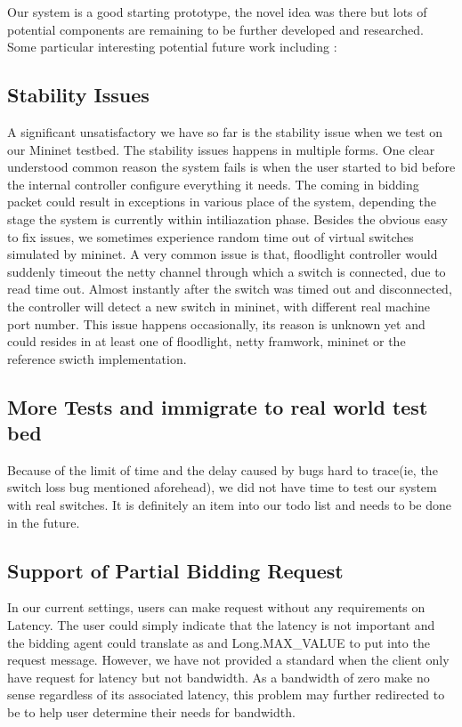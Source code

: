 \documentclass[a4paper,11pt,twocolumn]{article}
\begin{document}
Our system is a good starting prototype, the novel idea was there but lots of potential components are remaining to be 
further developed and researched. Some particular interesting potential future work including :

\subsection{Stability Issues}
A significant unsatisfactory we have so far is the stability issue when we test on our Mininet testbed. 
The stability issues happens in multiple forms.  One clear understood common reason the system fails is when the user 
started to bid before the internal controller configure everything it needs. The coming in bidding packet could result in
 exceptions in various place of the system, depending the stage the system is currently within intiliazation phase. 
Besides the obvious easy to fix issues, we sometimes experience random time out of virtual switches simulated by mininet. 
A very common issue is that, floodlight controller would suddenly timeout the netty channel through which a switch is connected, 
due to read time out. Almost instantly after the switch was timed out and disconnected, the controller will detect a new switch 
in mininet, with different real machine port number. This issue happens occasionally, its reason is unknown yet and could resides
 in at least one of floodlight, netty framwork, mininet  or the reference swicth implementation.

\subsection{More Tests and immigrate to real world test bed}
Because of the limit of time and the delay caused by bugs hard to trace(ie, the switch loss bug mentioned aforehead), 
we did not have time to test our system with real switches. It is definitely an item into our todo list and needs to be done in the future.

\subsection{Support of Partial Bidding Request}
In our current settings, users can make request without any requirements on Latency. The user could simply indicate that the latency 
is not important and the bidding agent  could translate as and Long.MAX\_VALUE to put into the request message. However,
 we have not provided a standard when the client only have request for latency but not bandwidth. As a bandwidth of zero make
 no sense regardless of its associated latency, this problem may further redirected to be to help user determine their needs for bandwidth.
\end{document}
